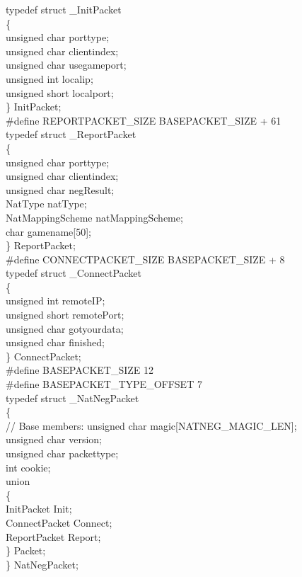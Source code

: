 \documentclass[oneside,titlepage,a4paper]{Definition/retrospy} %
\begin{document}
\begin{tcolorbox}
typedef struct \_InitPacket\\
\{\\
	unsigned char porttype;\\
	unsigned char clientindex;\\
	unsigned char usegameport;\\
	unsigned int localip;\\
	unsigned short localport;\\
\} InitPacket;\\

\#define REPORTPACKET\_SIZE BASEPACKET\_SIZE + 61\\
typedef struct \_ReportPacket\\
\{\\
	unsigned char porttype;\\
	unsigned char clientindex;\\
	unsigned char negResult;\\
	NatType natType;\\
	NatMappingScheme natMappingScheme;\\
	char gamename[50];\\
\} ReportPacket;\\

\#define CONNECTPACKET\_SIZE BASEPACKET\_SIZE + 8\\
typedef struct \_ConnectPacket\\
\{\\
	unsigned int remoteIP;\\
	unsigned short remotePort;\\
	unsigned char gotyourdata;\\
	unsigned char finished;\\
\} ConnectPacket;\\

\#define BASEPACKET\_SIZE 12\\
\#define BASEPACKET\_TYPE\_OFFSET 7\\
typedef struct \_NatNegPacket \\
\{\\
	// Base members:
	unsigned char magic[NATNEG\_MAGIC\_LEN];\\
	unsigned char version;\\
	unsigned char packettype;\\
	int cookie;	\\
	
	union \\
	\{\\
		InitPacket Init;\\
		ConnectPacket Connect;\\
		ReportPacket Report;\\
	\} Packet;\\
	
\} NatNegPacket;


\end{tcolorbox}
\end{document}
